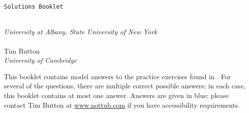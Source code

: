 \thispagestyle{empty}

\vfill


\

\noindent\hfill {\HUGE\forallxcam}

\

\noindent\hfill{\large\texttt{Solutions Booklet}}


\vfill


\\
\emph{University at Albany, State University of New York}\\
\\
{Tim Button}\\
\emph{University of Cambridge}




\newpage
\thispagestyle{empty}%
\noindent This booklet contains model answers to the practice exercises found in \forallxcam. For several of the questions, there are multiple correct possible answers; in each case, this booklet contains at most one answer.  Answers are given in blue; please contact Tim Button at \url{www.nottub.com} if you have accessibility requirements.

